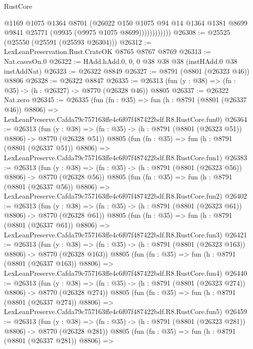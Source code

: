 \begin{lexlean}{RustCore}
\begin{coremodule}
                      @1169
                      @1075
                      @1364
                      @8701
                      (@26022
                        @150
                        @1075
                        @94
                        @14
                        @1364
                        @1381
                        @8699
                        @9841
                        @25771
                        (@9935 (@9975 @1075 @8699))))))))))))
@26308 := @25525 (@25550 (@25591 (@25593 @26304)))
@26312 := LexLeanPreservation.Rust.CrateOK @8765 @8767 @8769
@26313 := Nat.casesOn.{0}
@26322 := HAdd.hAdd.{0, 0, 0} @38 @38 @38 (instHAdd.{0} @38 instAddNat)
@26323 := @26322 @8849
@26327 := @8791 (@8801 (@26323 @46)) @8806
@26328 := @26322 @8847
@26335 := @26313 (fun (y : @38) => (fn : @35) -> (h : @26327) -> @8770 (@26328 @46)) @8805
@26337 := @26322 Nat.zero
@26345 := @26335
    (fun (fn : @35) =>
    fun (h : @8791 (@8801 (@26337 @46)) @8806) =>
    LexLeanPreserve.Cafda79c757163ffe4c6f07f487422bdf.R8.RustCore.fun0)
@26364 := @26313
    (fun (y : @38) => (fn : @35) -> (h : @8791 (@8801 (@26323 @51)) @8806) -> @8770 (@26328 @51))
    @8805
    (fun (fn : @35) =>
    fun (h : @8791 (@8801 (@26337 @51)) @8806) =>
    LexLeanPreserve.Cafda79c757163ffe4c6f07f487422bdf.R8.RustCore.fun1)
@26383 := @26313
    (fun (y : @38) => (fn : @35) -> (h : @8791 (@8801 (@26323 @56)) @8806) -> @8770 (@26328 @56))
    @8805
    (fun (fn : @35) =>
    fun (h : @8791 (@8801 (@26337 @56)) @8806) =>
    LexLeanPreserve.Cafda79c757163ffe4c6f07f487422bdf.R8.RustCore.fun2)
@26402 := @26313
    (fun (y : @38) => (fn : @35) -> (h : @8791 (@8801 (@26323 @61)) @8806) -> @8770 (@26328 @61))
    @8805
    (fun (fn : @35) =>
    fun (h : @8791 (@8801 (@26337 @61)) @8806) =>
    LexLeanPreserve.Cafda79c757163ffe4c6f07f487422bdf.R8.RustCore.fun3)
@26421 := @26313
    (fun (y : @38) => (fn : @35) -> (h : @8791 (@8801 (@26323 @163)) @8806) -> @8770 (@26328 @163))
    @8805
    (fun (fn : @35) =>
    fun (h : @8791 (@8801 (@26337 @163)) @8806) =>
    LexLeanPreserve.Cafda79c757163ffe4c6f07f487422bdf.R8.RustCore.fun4)
@26440 := @26313
    (fun (y : @38) => (fn : @35) -> (h : @8791 (@8801 (@26323 @274)) @8806) -> @8770 (@26328 @274))
    @8805
    (fun (fn : @35) =>
    fun (h : @8791 (@8801 (@26337 @274)) @8806) =>
    LexLeanPreserve.Cafda79c757163ffe4c6f07f487422bdf.R8.RustCore.fun5)
@26459 := @26313
    (fun (y : @38) => (fn : @35) -> (h : @8791 (@8801 (@26323 @281)) @8806) -> @8770 (@26328 @281))
    @8805
    (fun (fn : @35) =>
    fun (h : @8791 (@8801 (@26337 @281)) @8806) =>

\end{coremodule}
\end{lexlean}
